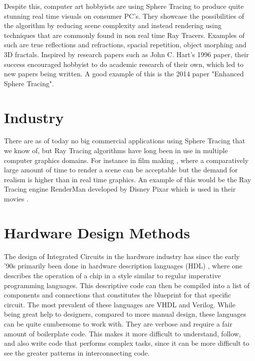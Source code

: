		Despite this, computer art hobbyists are using Sphere Tracing to
		produce quite stunning real time visuals on consumer PC's. They
		showcase the possibilities of the algorithm by reducing scene
		complexity and instead rendering using techniques that are commonly
		found in non real time Ray Tracers. Examples of such are true
		reflections and refractions, spacial repetition, object morphing and 3D
		fractals\cite{InigoQuilez}.  Inspired by research papers such as John
		C. Hart's 1996 paper\cite{Hart1996}, their success encouraged hobbyist
		to do academic research of their own, which led to new papers being
		written. A good example of this is the 2014 paper "Enhanced Sphere
		Tracing"\cite{Korndorfer2014}.

	\section{ Industry }		

		There are as of today no big commercial applications using Sphere Tracing
		that we know of, but Ray Tracing algorithms have long been in use in
		multiple computer graphics domains. For instance in film making
		\cite{Christensen2006}, where a comparatively large amount of time to
		render a scene can be acceptable but the demand for realism is higher
		than in real time graphics. An example of this would be the Ray Tracing
		engine RenderMan developed by Disney Pixar which is used in their movies
		\cite{Christensen2006}.
	
	\section{ Hardware Design Methods } 
	
		The design of Integrated Circuits in the hardware industry has since
		the early '90s primarily been done in hardware description languages
		(HDL) \cite{Chen2012}, where one describes the operation of a chip in a
		style similar to regular imperative programming languages. This
		descriptive code can then be compiled into a list of components and
		connections that constitutes the blueprint for that specific circuit.
		The most prevalent of these languages are VHDL and Verilog\cite{TODO}.
		While being great help to designers, compared to more manual design,
		these languages can be quite cumbersome to work with. They are verbose
		and require a fair amount of boilerplate code. This makes it more
		difficult to understand, follow, and also write code that performs
		complex tasks, since it can be more difficult to see the greater
		patterns in interconnecting code\cite{TODO}.
		
